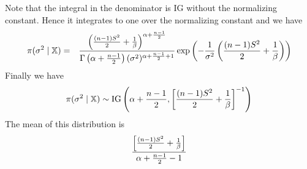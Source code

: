 \documentclass[12pt]{article}
\begin{document}
Note that the integral in the denominator is IG without the
normalizing constant. Hence it integrates to one over the
normalizing constant and we have
\begin{eqnarray*}
\pi(\sigma^2\mid\mathbb X)&=&
%
{
\left({(n-1)S^2\over2}+{1\over\beta}\right)^{\alpha+{n-1\over2}}
\over
\Gamma\left(\alpha+{n-1\over2}\right)
(\sigma^2)^{\alpha+{n-1\over2}+1}
}
%
\exp\left(
-{1\over\sigma^2}\left({(n-1)S^2\over2}+{1\over\beta}\right)
\right)
\end{eqnarray*}
Finally we have
$$\pi(\sigma^2\mid\mathbb X)\sim{\rm IG}\left(\alpha+{n-1\over2},\left[{(n-1)S^2\over2}+{1\over\beta}\right]^{-1}\right)$$
The mean of this distribution is
$$
{
\left[{(n-1)S^2\over2}+{1\over\beta}\right]
\over
\alpha+{n-1\over2}-1
}$$
\end{document}
